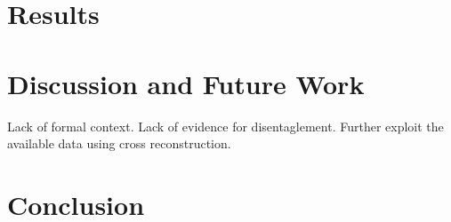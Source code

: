 \documentclass{article} %
\begin{document}
\section*{Results}


\section*{Discussion and Future Work}
Lack of formal context.
Lack of evidence for disentaglement.
Further exploit the available data using cross reconstruction.

\section*{Conclusion}



\newpage


\end{document}
